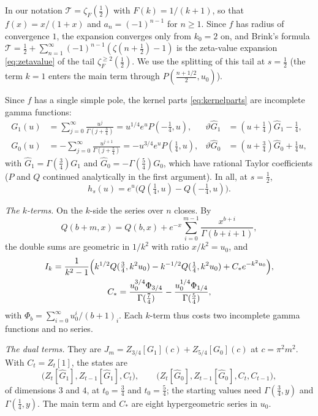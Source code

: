 \documentclass[11pt,reqno]{amsart}
\theoremstyle{definition}
\theoremstyle{remark}
\begin{document}
In our notation $\mathcal T = \zeta_F(\frac12)$ with $F(k) = 1/(k+1)$, so that $f(x) = x/(1+x)$ and
$a_n = (-1)^{n-1}$ for $n \ge 1$. Since $f$ has radius of convergence $1$, the expansion converges only from $k_0 = 2$
on, and Brink's formula $\mathcal T = \frac12 + \sum_{n=1}^{\infty}(-1)^{n-1}(\zeta(n+\frac12) - 1)$ is the
zeta-value expansion \eqref{eq:zetavalue} of the tail $\zeta_F^{\ge2}(\frac12)$. We use the splitting of this tail at
$s = \frac12$ (the term $k = 1$ enters the main term through $P(\frac{n+1/2}2, u_0)$).

Since $f$ has a single simple pole, the kernel parts \eqref{eq:kernelparts} are incomplete gamma functions:
\begin{align*}
  G_1(u) &= \sum_{j=0}^{\infty}\frac{u^j}{\Gamma(j+\frac34)} = u^{1/4}e^uP(-\tfrac14,u), &
  \vartheta\widehat G_1 &= (u + \tfrac14)\widehat G_1 - \tfrac14, \\
  G_0(u) &= -\sum_{j=0}^{\infty}\frac{u^{j+1}}{\Gamma(j+\frac54)} = -u^{3/4}e^uP(\tfrac14,u), &
  \vartheta\widehat G_0 &= (u + \tfrac34)\widehat G_0 + \tfrac14u,
\end{align*}
with $\widehat G_1 = \Gamma(\frac34)G_1$ and $\widehat G_0 = -\Gamma(\frac54)G_0$, which have rational Taylor
coefficients ($P$ and $Q$ continued analytically in the first argument). In all, at $s = \frac12$,
\[
  h_s(u) = e^u\bigl(Q(\tfrac14,u) - Q(-\tfrac14,u)\bigr).
\]

\emph{The $k$-terms.} On the $k$-side the series over $n$ closes. By
\[
  Q(b+m,x) = Q(b,x) + e^{-x}\sum_{i=0}^{m-1}\frac{x^{b+i}}{\Gamma(b+i+1)},
\]
the double sums are geometric in $1/k^2$ with ratio $x/k^2 = u_0$, and
\begin{gather*}
  I_k = \frac{1}{k^2-1}\Bigl(k^{1/2}Q(\tfrac34, k^2u_0) - k^{-1/2}Q(\tfrac14, k^2u_0) + C_*e^{-k^2u_0}\Bigr), \\
  C_* = \frac{u_0^{3/4}\Phi_{3/4}}{\Gamma(\frac74)} - \frac{u_0^{1/4}\Phi_{1/4}}{\Gamma(\frac54)},
\end{gather*}
with $\Phi_b = \sum_{i=0}^{\infty}u_0^i/(b+1)_i$. Each $k$-term thus costs two incomplete gamma functions and no series.

\emph{The dual terms.} They are $J_m = Z_{3/4}[G_1](c) + Z_{5/4}[G_0](c)$ at $c = \pi^2m^2$. With $C_t = Z_t[1]$,
the states are
\[
  \bigl(Z_t[\widehat G_1], Z_{t-1}[\widehat G_1], C_t\bigr), \qquad
  \bigl(Z_t[\widehat G_0], Z_{t-1}[\widehat G_0], C_t, C_{t-1}\bigr),
\]
of dimensions $3$ and $4$, at $t_0 = \frac34$ and $t_0 = \frac54$; the starting values need $\Gamma(\frac34,y)$ and
$\Gamma(\frac14,y)$. The main term and $C_*$ are eight hypergeometric series in $u_0$.
\end{document}
